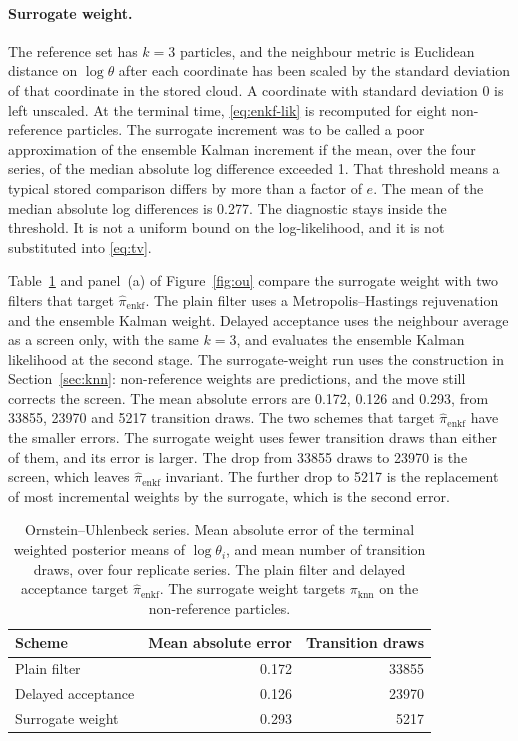 \paragraph{Surrogate weight.}
The reference set has \(k = 3\) particles, and the neighbour metric is Euclidean distance on \(\log\theta\) after each coordinate has been scaled by the standard deviation of that coordinate in the stored cloud. A coordinate with standard deviation 0 is left unscaled. At the terminal time, \eqref{eq:enkf-lik} is recomputed for eight non-reference particles. The surrogate increment was to be called a poor approximation of the ensemble Kalman increment if the mean, over the four series, of the median absolute log difference exceeded 1. That threshold means a typical stored comparison differs by more than a factor of \(e\). The mean of the median absolute log differences is 0.277. The diagnostic stays inside the threshold. It is not a uniform bound on the log-likelihood, and it is not substituted into \eqref{eq:tv}.

Table~\ref{tab:ou} and panel~(a) of Figure~\ref{fig:ou} compare the surrogate weight with two filters that target \(\hat{\pi}_{\mathrm{enkf}}\). The plain filter uses a Metropolis--Hastings rejuvenation and the ensemble Kalman weight. Delayed acceptance uses the neighbour average as a screen only, with the same \(k = 3\), and evaluates the ensemble Kalman likelihood at the second stage. The surrogate-weight run uses the construction in Section~\ref{sec:knn}: non-reference weights are predictions, and the move still corrects the screen. The mean absolute errors are 0.172, 0.126 and 0.293, from 33855, 23970 and 5217 transition draws. The two schemes that target \(\hat{\pi}_{\mathrm{enkf}}\) have the smaller errors. The surrogate weight uses fewer transition draws than either of them, and its error is larger. The drop from 33855 draws to 23970 is the screen, which leaves \(\hat{\pi}_{\mathrm{enkf}}\) invariant. The further drop to 5217 is the replacement of most incremental weights by the surrogate, which is the second error.

\begin{table}[htbp]
\centering
\caption{Ornstein--Uhlenbeck series. Mean absolute error of the terminal weighted posterior means of \(\log\theta_i\), and mean number of transition draws, over four replicate series. The plain filter and delayed acceptance target \(\hat{\pi}_{\mathrm{enkf}}\). The surrogate weight targets \(\pi_{\mathrm{knn}}\) on the non-reference particles.}
\label{tab:ou}
\begin{tabular}{lrr}
\toprule
Scheme & Mean absolute error & Transition draws \\
\midrule
Plain filter & 0.172 & 33855 \\
Delayed acceptance & 0.126 & 23970 \\
Surrogate weight & 0.293 & 5217 \\
\bottomrule
\end{tabular}
\end{table}

